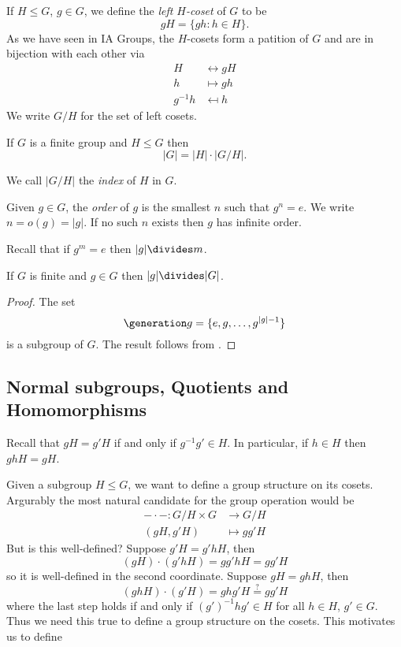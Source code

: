 \documentclass[a4paper]{article}
\begin{document}
If \(H \leq G\), \(g \in G\), we define the \emph{left \(H\)-coset} of \(G\) to be
\[
  gH = \{gh: h \in H\}.
\]
As we have seen in IA Groups, the \(H\)-cosets form a patition of \(G\) and are in bijection with each other via
\begin{align*}
  H &\leftrightarrow gH \\
  h &\mapsto gh \\
  g^{-1}h &\mapsfrom h
\end{align*}
We write \(G/H\) for the set of left cosets.

\begin{theorem}[Lagrange]
  \label{thm:lagrange}
  If \(G\) is a finite group and \(H \leq G \) then
  \[
    |G| = |H| \cdot |G/H|.
  \]
\end{theorem}

We call \(|G/H|\) the \emph{index} of \(H\) in \(G\).

\begin{definition}[Order]
  Given \(g \in G\), the \emph{order} of \(g\) is the smallest \(n\) such that \(g^n = e\). We write \(n = o(g) = |g|\). If no such \(n\) exists then \(g\) has infinite order.
\end{definition}

Recall that if \(g^m = e\) then \(|g| \divides m\).

\begin{lemma}
  If \(G\) is finite and \(g \in G\) then \(|g| \divides |G|\).
\end{lemma}

\begin{proof}
  The set
  \[
    \generation g = \{e, g, \dots, g^{|g| - 1}\}
  \]
  is a subgroup of \(G\). The result follows from .
\end{proof}

\subsection{Normal subgroups, Quotients and Homomorphisms}

Recall that \(gH = g'H\) if and only if \(g^{-1}g' \in H\). In particular, if \(h \in H\) then \(ghH = gH\).

Given a subgroup \(H \leq G\), we want to define a group structure on its cosets. Argurably the most natural candidate for the group operation would be
\begin{align*}
  - \cdot -: G/H \times G &\to G/H \\
  (gH, g'H) &\mapsto gg'H
\end{align*}
But is this well-defined? Suppose \(g'H = g'hH\), then
\[
  (gH) \cdot (g'hH) = gg'hH = gg'H
\]
so it is well-defined in the second coordinate. Suppose \(gH = ghH\), then
\[
  (ghH) \cdot (g'H) = ghg' H \stackrel{?}{=} gg'H
\]
where the last step holds if and only if \((g')^{-1}hg' \in H\) for all \(h \in H\), \(g' \in G\). Thus we need this true to define a group structure on the cosets. This motivates us to define
\end{document}

